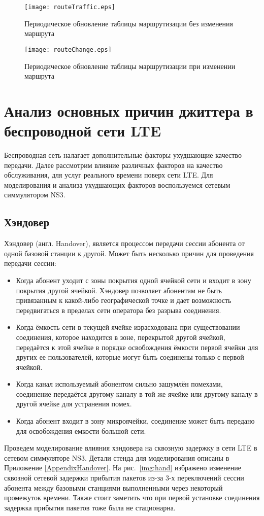 \begin{figure} [h]
  \center
\texttt{[image: routeTraffic.eps]}
  \caption{Периодическое обновление таблицы маршрутизации без изменения маршрута \cite{clark}}
  \label{img:routeTraffic}
\end{figure}
\begin{figure} [h]
  \center
\texttt{[image: routeChange.eps]}
  \caption{Периодическое обновление таблицы маршрутизации при изменении маршрута \cite{clark}}
  \label{img:routeChange}
\end{figure}

\section{Анализ основных причин джиттера в беспроводной сети LTE} \label{sect2_2}
Беспроводная сеть налагает дополнительные факторы ухудшающие качество передачи. Далее рассмотрим влияние различных факторов на качество обслуживания, для услуг реального времени поверх сети LTE. Для моделирования и анализа ухудшающих факторов воспользуемся сетевым симмулятором NS3.

\subsection{Хэндовер}  \label{handover_chapter2}
Хэндовер (англ. Handover), является процессом передачи сессии абонента от одной базовой станции к другой. Может быть несколько причин для проведения передачи сессии:
\begin{itemize}
\item Когда абонент уходит с зоны покрытия одной ячейкой сети и входит в зону покрытия другой ячейкой. Хэндовер позволяет абонентам не быть привязанным к какой-либо географической точке и дает возможность передвигаться в пределах сети оператора без разрыва соединения.
\item Когда ёмкость сети в текущей ячейке израсходована при существовании соединения, которое находится в зоне, перекрытой другой ячейкой, передаётся к этой ячейке в порядке освобождения ёмкости первой ячейки для других ее пользователей, которые могут быть соединены только с первой ячейкой.
\item Когда канал используемый абонентом сильно зашумлён помехами, соединение передаётся другому каналу в той же ячейке или другому каналу в другой ячейке для устранения помех.
\item Когда абонент входит в зону микроячейки, соединение может быть передано для освобождения емкости большой сети.
\end{itemize}
Проведем моделирование влияния хэндовера на сквозную задержку в сети LTE в сетевом симмуляторе NS3. Детали стенда для моделирования описаны в Приложение \ref{AppendixHandover}. На рис. \ref{img:hand} избражено изменение сквозной сетевой задержки прибытия пакетов из-за 3-х переключений сессии абонента между базовыми станциями выполненными через некоторый промежуток времени. Также стоит заметить что при первой установке соединения задержка прибытия пакетов тоже была не стационарна.

